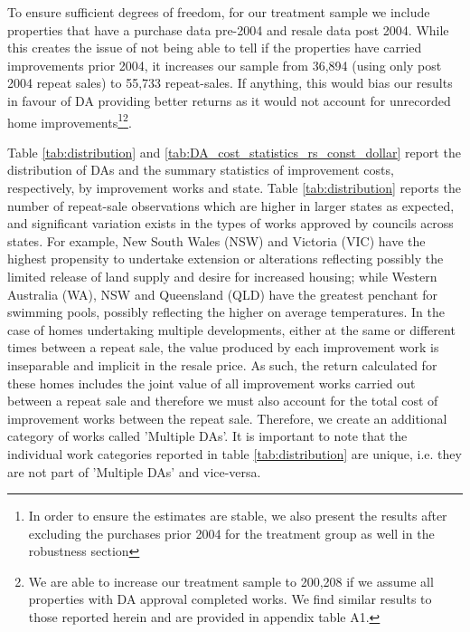 \documentclass[AEJ,reqno, draftmode]{AEA} %
\begin{document}
To ensure sufficient degrees of freedom, for our treatment sample we include properties that have a purchase data pre-2004 and resale data post 2004. While this creates the issue of not being able to tell if the properties have carried improvements prior 2004, it increases our sample from 36,894 (using only post 2004 repeat sales) to 55,733 repeat-sales. If anything, this would bias our results in favour of DA providing better returns as it would not account for unrecorded home improvements\footnote{In order to ensure the estimates are stable, we also present the results after excluding the purchases prior 2004 for the treatment group as well in the robustness section}\footnote{We are able to increase our treatment sample to 200,208 if we assume all properties with DA approval completed works. We find similar results to those reported herein and are provided in appendix table A1.}. 



%

Table \ref{tab:distribution} and \ref{tab:DA_cost_statistics_rs_const_dollar} report the distribution of DAs and the summary statistics of improvement costs, respectively,  by improvement works and state. Table \ref{tab:distribution} reports the number of repeat-sale observations which are higher in larger states as expected, and significant variation exists in the types of works approved by councils across states. For example, New South Wales (NSW) and Victoria (VIC) have the highest propensity to undertake extension or alterations reflecting possibly the limited release of land supply and desire for increased housing; while Western Australia (WA), NSW and Queensland (QLD) have the greatest penchant for swimming pools, possibly reflecting the higher on average temperatures. In the case of homes undertaking multiple developments, either at the same or different times between a repeat sale, the value produced by each improvement work is inseparable and implicit in the resale price. As such, the return calculated for these homes includes the joint value of all improvement works carried out between a repeat sale and therefore we must also account for the total cost of improvement works between the repeat sale. Therefore, we create an additional category of works called 'Multiple DAs'. It is important to note that the individual work categories reported in table \ref{tab:distribution} are unique, i.e. they are not part of 'Multiple DAs' and vice-versa.
\end{document}
